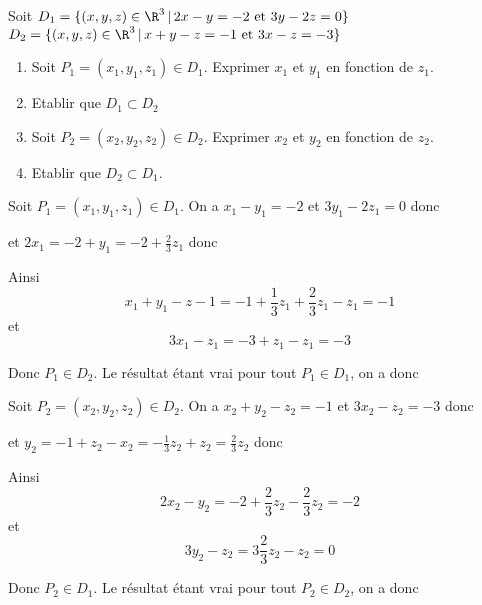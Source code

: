 



\begin{exercice}
Soit $D_1 = \{ (x,y,z) \in \R^3 \, |\, 2x-y=-2 \text{ et } 3y -2z=0\}$
$D_2 = \{ (x,y,z) \in \R^3 \, |\, x+y-z=-1 \text{ et } 3x -z=-3\}$

\begin{enumerate}
\item Soit $P_1=(x_1,y_1,z_1)\in D_1$. Exprimer $x_1$ et $y_1$ en fonction de $z_1$. 
\item Etablir que $D_1\subset D_2$
\item Soit $P_2=(x_2,y_2,z_2)\in D_2$. Exprimer $x_2$ et $y_2$ en fonction de $z_2$. 
\item Etablir que $D_2\subset D_1$. 
\end{enumerate}

\end{exercice}

\begin{correction}
Soit $P_1 =(x_1,y_1,z_1)\in D_1$. On a 
$x_1-y_1 =-2$ et $3y_1-2z_1= 0$ donc 
\begin{center}
\end{center}
et  $2x_1 =-2 +y_1 = -2 + \frac{2}{3}z_1$
donc 
\begin{center}
\end{center}
Ainsi 
$$x_1+y_1-z-1= -1 + \frac{1}{3}z_1 + \frac{2}{3}z_1 -z_1=-1$$
et 
$$3x_1-z_1 = -3 +z_1-z_1=-3$$

Donc $P_1 \in D_2$. Le résultat étant vrai pour tout $P_1 \in D_1$, on a donc 

\begin{center}

\end{center}


Soit $P_2 =(x_2,y_2,z_2)\in D_2$. On a 
$x_2+y_2 -z_2=-1$ et $3x_2-z_2= -3$ donc 
\begin{center}

\end{center}

et  $y_2 =-1+z_2-x_2 = -\frac{1}{3}z_2+z_2=\frac{2}{3}z_2$
donc 
\begin{center}

\end{center}


Ainsi 
$$2x_2-y_2 = -2 +\frac{2}{3}z_2-\frac{2}{3}z_2 =-2$$
et 
$$3y_2-z_2 = 3 \frac{2}{3}z_2 -z_2=0$$

Donc $P_2 \in D_1$. Le résultat étant vrai pour tout $P_2 \in D_2$, on a donc 

\begin{center}

\end{center}
\end{correction}